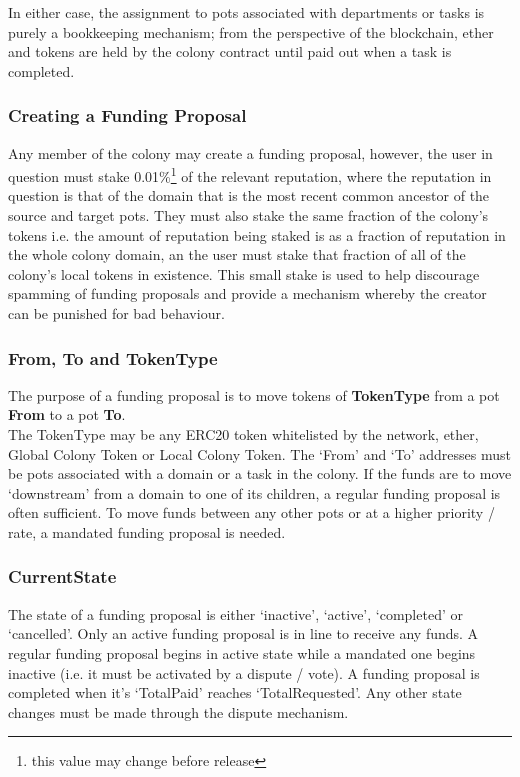 In either case, the assignment to pots associated with departments or tasks is purely a bookkeeping mechanism; from the perspective of the blockchain, ether and tokens are held by the colony contract until paid out when a task is completed. 

\subsubsection*{Creating a Funding Proposal}
Any member of the colony may create a funding proposal, however, the user in question must stake 0.01\%\footnote{this value may change before release} of the relevant reputation, where the reputation in question is that of the domain that is the most recent common ancestor of the source and target pots. They must also stake the same fraction of the colony's tokens i.e. the amount of reputation being staked is as a fraction of reputation in the whole colony domain, an the user must stake that fraction of all of the colony's local tokens in existence. This small stake is used to help discourage spamming of funding proposals and provide a mechanism whereby the creator can be punished for bad behaviour. 

\subsubsection*{From, To and TokenType}
The purpose of a funding proposal is to move tokens of \textbf{TokenType} from a pot \textbf{From} to a pot \textbf{To}. \\
The TokenType may be any ERC20 token whitelisted by the network, ether, Global Colony Token or Local Colony Token. The `From' and `To' addresses must be pots associated with a domain or a task in the colony. If the funds are to move `downstream' from a domain to one of its children, a regular funding proposal is often sufficient. To move funds between any other pots or at a higher priority / rate, a mandated funding proposal is needed.

\subsubsection*{CurrentState}
The state of a funding proposal is either `inactive', `active', `completed' or `cancelled'. Only an active funding proposal is in line to receive any funds. A regular funding proposal begins in active state while a mandated one begins inactive (i.e. it must be activated by a dispute / vote). A funding proposal is completed when it's `TotalPaid' reaches `TotalRequested'. Any other state changes must be made through the dispute mechanism.

